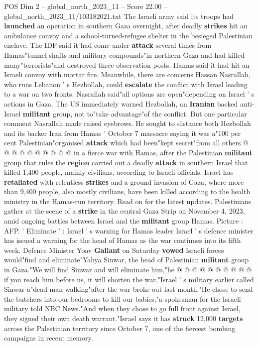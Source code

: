 \begin{textsample}{POS Dim 2 – global\_north\_2023\_11 – Score 22.00 – global\_north\_2023\_11/103182021.txt}  \label{ex:f2_pos_305}
The Israeli army said its troops had \textbf{launched} an operation in southern Gaza overnight, after deadly \textbf{strikes} hit an ambulance convoy and a school-turned-refugee shelter in the besieged Palestinian enclave.
The IDF said it had come under \textbf{attack} several times from Hamas"tunnel shafts and military compounds"in northern Gaza and had killed many"terrorists"and destroyed three observation posts.
Hamas said it had hit an Israeli convoy with mortar fire.
Meanwhile, there are concerns Hassan Nasrallah, who runs Lebanon ' s Hezbollah, could \textbf{escalate} the conflict with Israel leading to a war on two fronts.
Nasrallah said"all options are open"depending on Israel ' s actions in Gaza.
The US immediately warned Hezbollah, an \textbf{Iranian} backed anti-Israel \textbf{militant} group, not to"take advantage"of the conflict.
But one particular comment Nasrallah made raised eyebrows.
He sought to distance both Hezbollah and its backer Iran from Hamas ' October 7 massacre saying it was a"100 per cent Palestinian"organised \textbf{attack} which had been"kept secret"from all others @ @ @ @ @ @ @ @ @ @ in a fierce war with Hamas, after the Palestinian \textbf{militant} group that rules the \textbf{region} carried out a deadly \textbf{attack} in southern Israel that killed 1,400 people, mainly civilians, according to Israeli officials.
Israel has \textbf{retaliated} with relentless \textbf{strikes} and a ground invasion of Gaza, where more than 9,400 people, also mostly civilians, have been killed according to the health ministry in the Hamas-run territory.
Read on for the latest updates.
Palestinians gather at the scene of a \textbf{strike} in the central Gaza Strip on November 4, 2023, amid ongoing battles between Israel and the \textbf{militant} group Hamas.
Picture : AFP. ' Eliminate ' : Israel ' s warning for Hamas leader Israel ' s defence minister has issued a warning for the head of Hamas as the war continues into its fifth week.
Defence Minister Yoav \textbf{Gallant} on Saturday \textbf{vowed} Israeli forces would"find and eliminate"Yahya Sinwar, the head of Palestinian \textbf{militant} group in Gaza."We will find Sinwar and will eliminate him,"he @ @ @ @ @ @ @ @ @ @ if you reach him before us, it will shorten the war."Israel ' s military earlier called Sinwar a"dead man walking"after the war broke out last month."He chose to send the butchers into our bedrooms to kill our babies,"a spokesman for the Israeli military told NBC News."And when they chose to go full front against Israel, they signed their own death warrant."Israel says it has \textbf{struck} 12,000 \textbf{targets} across the Palestinian territory since October 7, one of the fiercest bombing campaigns in recent memory.

\end{textsample}
